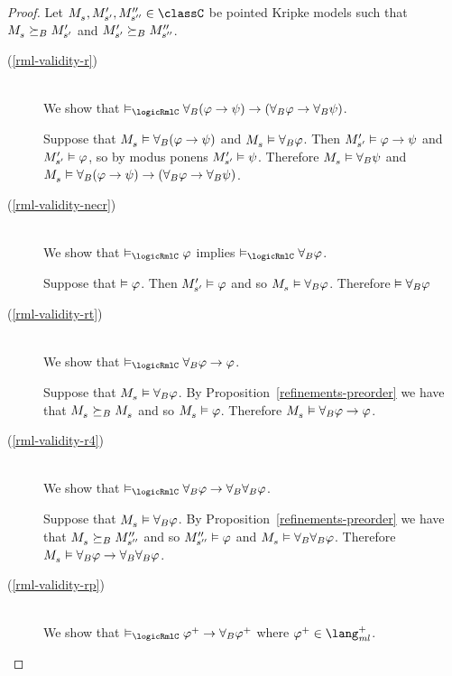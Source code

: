 \begin{proof}
Let $\kPModel{\kStateS}, \kPModelP{\kStateSP}, \kPModelPP{\kStateSPP} \in \classC$ be pointed Kripke models such that $\kPModel{\kStateS} \simulatesBs \kPModelP{\kStateSP}$ and ${M^{\prime}_{{s}^{\prime}}} \succeq_{B} {M^{\prime\prime}_{{s}^{\prime\prime}}}$.
\begin{description}
    \item[(\ref{rml-validity-r})]  \hfill \\
        We show that $\entails_\logicRmlC \allrefsBs (\phi \implies \psi) \implies (\allrefsBs \phi \implies \allrefsBs \psi)$.

        Suppose that $\kPModel{\kStateS} \entails \allrefsBs (\phi \implies \psi)$ and $\kPModel{\kStateS} \entails \allrefsBs \phi$.
        Then ${M^{\prime}_{{s}^{\prime}}} \vDash \varphi \rightarrow \psi$
        and ${M^{\prime}_{{s}^{\prime}}} \vDash \varphi$,
        so by modus ponens ${M^{\prime}_{{s}^{\prime}}} \vDash \psi$.
        Therefore $\kPModel{\kStateS} \entails \allrefsBs \psi$
        and $\kPModel{\kStateS} \entails \allrefsBs (\phi \implies \psi) \implies (\allrefsBs \phi \implies \allrefsBs \psi)$.
\pagebreak
    \item[(\ref{rml-validity-necr})] \hfill \\
        We show that $\entails_\logicRmlC \phi$ implies $\entails_\logicRmlC \allrefsBs \phi$.

        Suppose that $\vDash \varphi$. 
        Then ${M^{\prime}_{{s}^{\prime}}} \vDash \varphi$ and so $\kPModel{\kStateS} \entails \allrefsBs \phi$.
        Therefore $\vDash {\forall_{B}} \varphi$
    \item[(\ref{rml-validity-rt})] \hfill \\
        We show that $\entails_\logicRmlC \allrefsBs \phi \implies \phi$.

        Suppose that $\kPModel{\kStateS} \entails \allrefsBs \phi$.
        By Proposition~\ref{refinements-preorder} we have that $\kPModel{\kStateS} \simulatesBs \kPModel{\kStateS}$ and so $\kPModel{\kStateS} \entails \phi$.
        Therefore $\kPModel{\kStateS} \entails \allrefsBs \phi \implies \phi$.
    \item[(\ref{rml-validity-r4})] \hfill \\
        We show that $\entails_\logicRmlC \allrefsBs \phi \implies \allrefsBs \allrefsBs \phi$.

        Suppose that $\kPModel{\kStateS} \entails \allrefsBs \phi$.
        By Proposition~\ref{refinements-preorder} we have that $\kPModel{\kStateS} \simulatesBs \kPModelPP{\kStateSPP}$ and so ${M^{\prime\prime}_{{s}^{\prime\prime}}} \vDash \varphi$ and $\kPModel{\kStateS} \entails \allrefsBs \allrefsBs \phi$.
        Therefore $\kPModel{\kStateS} \entails \allrefsBs \phi \implies \allrefsBs \allrefsBs \phi$.
    \item[(\ref{rml-validity-rp})] \hfill \\
        We show that $\entails_\logicRmlC \phi^+ \implies \allrefsBs \phi^+$ where $\phi^+ \in \langMlPlus$.


\end{description}
\end{proof}
